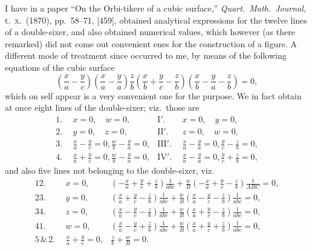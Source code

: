 \documentclass[11pt,a4paper]{book}
\begin{document}
I have in a paper ``On the Orbi-tikere of a cubic surface,'' \textit{Quart.\ Math.\ Journal},
t.~\textsc{x}.~(1870), pp.~58--71, [459], obtained analytical expressions for the twelve lines of
a double-sixer, and also obtained numerical values, which however (as there remarked)
did not come out convenient enes for the construction of a figure.  A different mode
of treatment since occurred to me, by means of the following equations of the cubic
surface
\[
\left(\frac{x}{a} - \frac{y}{c}\right)\left(\frac{x}{a} - \frac{y}{a}\right)\frac{z}{b}\left(\frac{x}{b} + \frac{y}{c} - \frac{z}{b}\right)\left(\frac{x}{b} - \frac{y}{a} - \frac{z}{b}\right) = 0,
\]
which on self appear is a very convenient one for the purpose.  We in fact obtain at
once eight lines of the double-sixer; viz.\ those are
\begin{align*}
1.\ \ & x = 0,\quad w = 0, & \mathrm{I'}.\ \ & x = 0,\quad y = 0, \\
2.\ \ & y = 0,\quad z = 0, & \mathrm{II'}.\ \ & z = 0,\quad w = 0, \\
3.\ \ & \tfrac{x}{a} - \tfrac{y}{c} = 0, \tfrac{w}{b} - \tfrac{y}{a} = 0, & \mathrm{III'}.\ \ & \tfrac{x}{a} - \tfrac{y}{a} = 0, \tfrac{y}{c} - \tfrac{z}{b} = 0, \\
4.\ \ & \tfrac{x}{a} + \tfrac{y}{c} = 0, \tfrac{w}{b} - \tfrac{y}{a} = 0, & \mathrm{IV'}.\ \ & \tfrac{x}{a} - \tfrac{y}{a} = 0, \tfrac{y}{c} + \tfrac{z}{b} = 0,
\end{align*}
and also five lines not belonging to the double-sixer, viz.\
\begin{align*}
12.\ \ & x = 0, & \left(-\tfrac{x}{a} + \tfrac{y}{c} + \tfrac{z}{b}\right)\tfrac{1}{abc} + \tfrac{w}{B}\left(-\tfrac{x}{a} + \tfrac{y}{c} - \tfrac{z}{b}\right)\tfrac{1}{ABC} = 0, \\
23.\ \ & y = 0, & \left(\tfrac{x}{a} + \tfrac{y}{c} - \tfrac{z}{b}\right)\tfrac{1}{abc} + \tfrac{w}{B}\left(\tfrac{x}{a} - \tfrac{y}{c} - \tfrac{z}{b}\right)\tfrac{1}{abc} = 0, \\
34.\ \ & z = 0, & \left(\tfrac{x}{a} - \tfrac{y}{c} - \tfrac{z}{b}\right)\tfrac{1}{abc} + \tfrac{w}{B}\left(\tfrac{x}{a} + \tfrac{y}{c} - \tfrac{z}{b}\right)\tfrac{1}{abc} = 0, \\
41.\ \ & w = 0, & \left(\tfrac{x}{a} - \tfrac{y}{c} + \tfrac{z}{b}\right)\tfrac{1}{abc} + \tfrac{w}{B}\left(\tfrac{x}{a} + \tfrac{y}{c} + \tfrac{z}{b}\right)\tfrac{1}{abc} = 0, \\
5\,\&\,2.\ \ & \tfrac{x}{a} + \tfrac{y}{c} = 0, & \tfrac{z}{b} + \tfrac{w}{B} = 0.
\end{align*}
\end{document}
